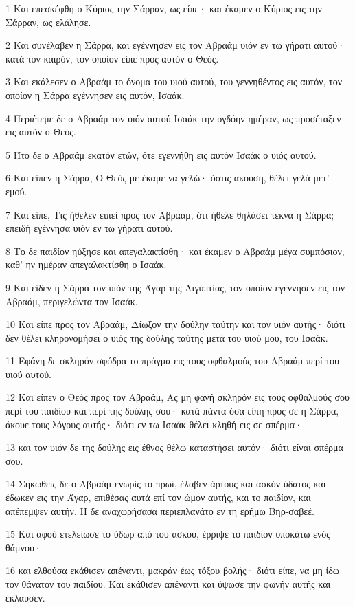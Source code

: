 \par 1 Και επεσκέφθη ο Κύριος την Σάρραν, ως είπε· και έκαμεν ο Κύριος εις την Σάρραν, ως ελάλησε.
\par 2 Και συνέλαβεν η Σάρρα, και εγέννησεν εις τον Αβραάμ υιόν εν τω γήρατι αυτού· κατά τον καιρόν, τον οποίον είπε προς αυτόν ο Θεός.
\par 3 Και εκάλεσεν ο Αβραάμ το όνομα του υιού αυτού, του γεννηθέντος εις αυτόν, τον οποίον η Σάρρα εγέννησεν εις αυτόν, Ισαάκ.
\par 4 Περιέτεμε δε ο Αβραάμ τον υιόν αυτού Ισαάκ την ογδόην ημέραν, ως προσέταξεν εις αυτόν ο Θεός.
\par 5 Ήτο δε ο Αβραάμ εκατόν ετών, ότε εγεννήθη εις αυτόν Ισαάκ ο υιός αυτού.
\par 6 Και είπεν η Σάρρα, Ο Θεός με έκαμε να γελώ· όστις ακούση, θέλει γελά μετ' εμού.
\par 7 Και είπε, Τις ήθελεν ειπεί προς τον Αβραάμ, ότι ήθελε θηλάσει τέκνα η Σάρρα; επειδή εγέννησα υιόν εν τω γήρατι αυτού.
\par 8 Το δε παιδίον ηύξησε και απεγαλακτίσθη· και έκαμεν ο Αβραάμ μέγα συμπόσιον, καθ' ην ημέραν απεγαλακτίσθη ο Ισαάκ.
\par 9 Και είδεν η Σάρρα τον υιόν της Άγαρ της Αιγυπτίας, τον οποίον εγέννησεν εις τον Αβραάμ, περιγελώντα τον Ισαάκ.
\par 10 Και είπε προς τον Αβραάμ, Δίωξον την δούλην ταύτην και τον υιόν αυτής· διότι δεν θέλει κληρονομήσει ο υιός της δούλης ταύτης μετά του υιού μου, του Ισαάκ.
\par 11 Εφάνη δε σκληρόν σφόδρα το πράγμα εις τους οφθαλμούς του Αβραάμ περί του υιού αυτού.
\par 12 Και είπεν ο Θεός προς τον Αβραάμ, Ας μη φανή σκληρόν εις τους οφθαλμούς σου περί του παιδίου και περί της δούλης σου· κατά πάντα όσα είπη προς σε η Σάρρα, άκουε τους λόγους αυτής· διότι εν τω Ισαάκ θέλει κληθή εις σε σπέρμα·
\par 13 και τον υιόν δε της δούλης εις έθνος θέλω καταστήσει αυτόν· διότι είναι σπέρμα σου.
\par 14 Σηκωθείς δε ο Αβραάμ ενωρίς το πρωΐ, έλαβεν άρτους και ασκόν ύδατος και έδωκεν εις την Άγαρ, επιθέσας αυτά επί τον ώμον αυτής, και το παιδίον, και απέπεμψεν αυτήν. Η δε αναχωρήσασα περιεπλανάτο εν τη ερήμω Βηρ-σαβεέ.
\par 15 Και αφού ετελείωσε το ύδωρ από του ασκού, έρριψε το παιδίον υποκάτω ενός θάμνου·
\par 16 και ελθούσα εκάθισεν απέναντι, μακράν έως τόξου βολής· διότι είπε, να μη ίδω τον θάνατον του παιδίου. Και εκάθισεν απέναντι και ύψωσε την φωνήν αυτής και έκλαυσεν.
